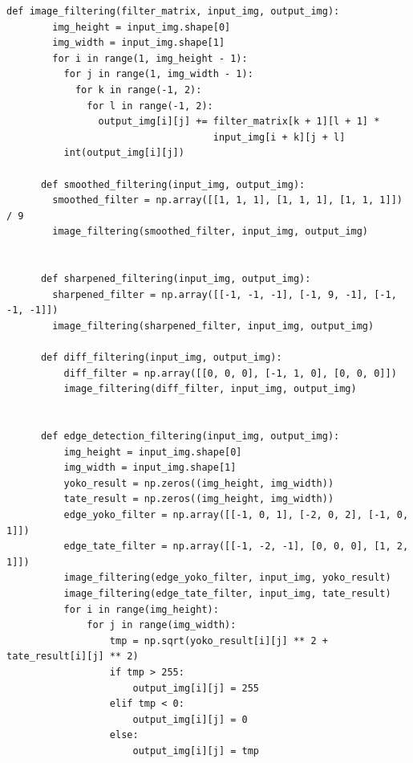 \documentclass[11pt,a4j]{jsarticle}
\begin{document}
    \begin{lstlisting}[basicstyle=\ttfamily\footnotesize, frame=single]
      def image_filtering(filter_matrix, input_img, output_img):
        img_height = input_img.shape[0]
        img_width = input_img.shape[1]
        for i in range(1, img_height - 1):
          for j in range(1, img_width - 1):
            for k in range(-1, 2):
              for l in range(-1, 2):
                output_img[i][j] += filter_matrix[k + 1][l + 1] *
                                    input_img[i + k][j + l]
          int(output_img[i][j])

      def smoothed_filtering(input_img, output_img):
        smoothed_filter = np.array([[1, 1, 1], [1, 1, 1], [1, 1, 1]]) / 9
        image_filtering(smoothed_filter, input_img, output_img)


      def sharpened_filtering(input_img, output_img):
        sharpened_filter = np.array([[-1, -1, -1], [-1, 9, -1], [-1, -1, -1]])
        image_filtering(sharpened_filter, input_img, output_img)

      def diff_filtering(input_img, output_img):
          diff_filter = np.array([[0, 0, 0], [-1, 1, 0], [0, 0, 0]])
          image_filtering(diff_filter, input_img, output_img)


      def edge_detection_filtering(input_img, output_img):
          img_height = input_img.shape[0]
          img_width = input_img.shape[1]
          yoko_result = np.zeros((img_height, img_width))
          tate_result = np.zeros((img_height, img_width))
          edge_yoko_filter = np.array([[-1, 0, 1], [-2, 0, 2], [-1, 0, 1]])
          edge_tate_filter = np.array([[-1, -2, -1], [0, 0, 0], [1, 2, 1]])
          image_filtering(edge_yoko_filter, input_img, yoko_result)
          image_filtering(edge_tate_filter, input_img, tate_result)
          for i in range(img_height):
              for j in range(img_width):
                  tmp = np.sqrt(yoko_result[i][j] ** 2 + tate_result[i][j] ** 2)
                  if tmp > 255:
                      output_img[i][j] = 255
                  elif tmp < 0:
                      output_img[i][j] = 0
                  else:
                      output_img[i][j] = tmp

    \end{lstlisting}
\end{document}
